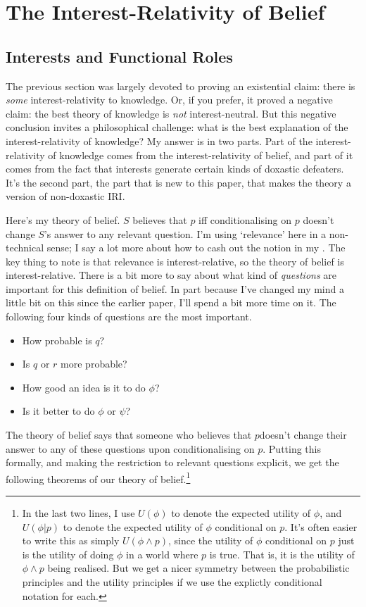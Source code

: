 \section{The Interest-Relativity of Belief}

\subsection{Interests and Functional Roles}
The previous section was largely devoted to proving an existential claim: there is \textit{some} interest-relativity to knowledge. Or, if you prefer, it proved a negative claim: the best theory of knowledge is \textit{not} interest-neutral. But this negative conclusion invites a philosophical challenge: what is the best explanation of the interest-relativity of knowledge? My answer is in two parts. Part of the interest-relativity of knowledge comes from the interest-relativity of belief, and part of it comes from the fact that interests generate certain kinds of doxastic defeaters. It's the second part, the part that is new to this paper, that makes the theory a version of non-doxastic IRI.

Here's my theory of belief. $S$ believes that $p$ iff conditionalising on $p$ doesn't change $S$'s answer to any relevant question. I'm using `relevance' here in a non-technical sense; I say a lot more about how to cash out the notion in my \citeyearpar{Weatherson2005-WEACWD}. The key thing to note is that relevance is interest-relative, so the theory of belief is interest-relative. There is a bit more to say about what kind of \textit{questions} are important for this definition of belief. In part because I've changed my mind a little bit on this since the earlier paper, I'll spend a bit more time on it. The following four kinds of questions are the most important.

\begin{itemize}
\item How probable is $q$?
\item Is $q$ or $r$ more probable?
\item How good an idea is it to do $\phi$?
\item Is it better to do $\phi$ or $\psi$?
\end{itemize}

\noindent The theory of belief says that someone who believes that $p$doesn't change their answer to any of these questions upon conditionalising on $p$. Putting this formally, and making the restriction to relevant questions explicit, we get the following theorems of our theory of belief.\footnote{In the last two lines, I use $U(\phi)$ to denote the expected utility of $\phi$, and $U(\phi | p)$ to denote the expected utility of $\phi$ conditional on $p$. It's often easier to write this as simply $U(\phi \wedge p)$, since the utility of $\phi$ conditional on $p$ just is the utility of doing $\phi$ in a world where $p$ is true. That is, it is the utility of $\phi \wedge p$ being realised. But we get a nicer symmetry between the probabilistic principles and the utility principles if we use the explictly conditional notation for each.}


